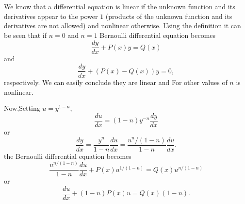 \begin{solution}
We know that a differential equation is linear if the unknown function and its derivatives appear to the power $1$ (products of the unknown function and its derivatives are not allowed) and nonlinear otherwise. Using the definition it can be seen that if $n=0$ and $n=1$ Bernoulli differential equation becomes \[ \frac{dy}{dx} + P(x) y = Q(x) \] and \[ \frac{dy}{dx} + (P(x)-Q(x)) y = 0, \] respectively. We can easily conclude they are linear and For other values of $n$ is nonlinear.

Now,Setting $u = y^{1-n}$,
\[\frac{du}{dx} = (1 - n) y^{-n}\frac{dy}{dx}\] or \[\frac{dy}{dx} = \frac{y^n}{1 - n} \frac{du}{dx}=\frac{u^n/(1-n)}{1-n} \frac{du}{dx}.\] 
the Bernoulli differential equation becomes \[\frac{u^{n/(1-n)}}{1 - n}
\frac{du}{dx} + P(x)u^{1/(1-n)} = Q(x)u^{n/(1-n)}\] or \[\frac{du}{dx} + (1 - n)P(x)u = Q(x)(1 - n).\]

\end{solution}